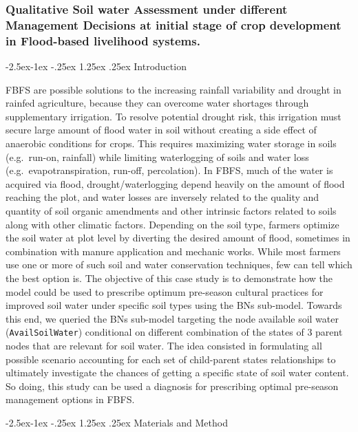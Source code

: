 \documentclass[12pt,oneside]{article}
\makeatletter
\renewcommand\paragraph{\@startsection{paragraph}{4}{\z@}%
            {-2.5ex\@plus -1ex \@minus -.25ex}%
            {1.25ex \@plus .25ex}%
            {\normalfont\normalsize\bfseries}}
\makeatother
\begin{document}
\hypertarget{IV21}{%
\subsubsection{Qualitative Soil water Assessment under different Management Decisions at initial stage of crop development in Flood-based livelihood systems.}\label{IV21}}

\hypertarget{IV211}{%
\paragraph{Introduction}\label{IV211}}

FBFS are possible solutions to the increasing rainfall variability and drought in rainfed agriculture, because they can overcome water shortages through supplementary irrigation. To resolve potential drought risk, this irrigation must secure large amount of flood water in soil without creating a side effect of anaerobic conditions for crops. This requires maximizing water storage in soils (e.g.~run-on, rainfall) while limiting waterlogging of soils and water loss (e.g.~evapotranspiration, run-off, percolation). In FBFS, much of the water is acquired via flood, drought/waterlogging depend heavily on the amount of flood reaching the plot, and water losses are inversely related to the quality and quantity of soil organic amendments and other intrinsic factors related to soils along with other climatic factors. Depending on the soil type, farmers optimize the soil water at plot level by diverting the desired amount of flood, sometimes in combination with manure application and mechanic works. While most farmers use one or more of such soil and water conservation techniques, few can tell which the best option is. The objective of this case study is to demonstrate how the model could be used to prescribe optimum pre-season cultural practices for improved soil water under specific soil types using the BNs sub-model. Towards this end, we queried the BNs sub-model targeting the node available soil water (\texttt{AvailSoilWater}) conditional on different combination of the states of 3 parent nodes that are relevant for soil water. The idea consisted in formulating all possible scenario accounting for each set of child-parent states relationships to ultimately investigate the chances of getting a specific state of soil water content. So doing, this study can be used a diagnosis for prescribing optimal pre-season management options in FBFS.

\hypertarget{IV212}{%
\paragraph{Materials and Method}\label{IV212}}
\end{document}
